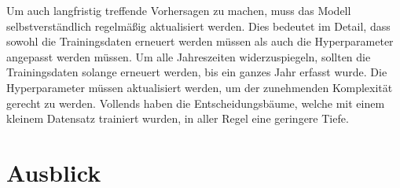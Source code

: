 \documentclass[12pt, a4paper]{article}
\begin{document}
Um auch langfristig treffende Vorhersagen zu machen, muss das Modell selbstverständlich regelmäßig aktualisiert werden. Dies bedeutet im Detail, dass sowohl die Trainingsdaten erneuert werden müssen als auch die Hyperparameter angepasst werden müssen. Um alle Jahreszeiten widerzuspiegeln, sollten die Trainingsdaten solange erneuert werden, bis ein ganzes Jahr erfasst wurde. Die Hyperparameter müssen aktualisiert werden, um der zunehmenden Komplexität gerecht zu werden. Vollends haben die Entscheidungsbäume, welche mit einem kleinem Datensatz trainiert wurden, in aller Regel eine geringere Tiefe.



\newpage

\section{Ausblick}
\label{sec:outlook}
\end{document}
